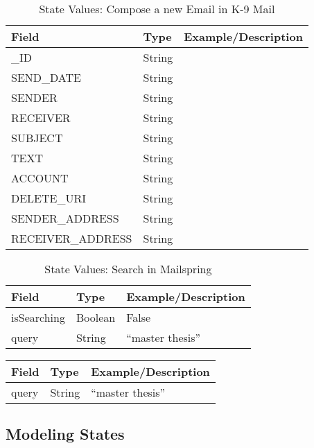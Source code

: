 \FloatBarrier \begin{table}[H]
\centering
\begin{tabular}{lll}
Field     & Type      & Example/Description \\
\hline
\_ID            & String &  \\
SEND\_DATE      & String     &                     \\
SENDER         &  String    &                     \\
RECEIVER         &  String    &                     \\
SUBJECT        &  String    &                     \\
TEXT        &  String    &                     \\
ACCOUNT        &   String   &                     \\
DELETE\_URI     &  String    &                     \\
SENDER\_ADDRESS &   String   &                    \\
RECEIVER\_ADDRESS &   String   &                    
\end{tabular}
\caption{State Values: Compose a new Email in K-9 Mail}
\label{tab:compose_new_email_k9}
\centering
\end{table} \FloatBarrier



\FloatBarrier \begin{table}[H]
\centering
\begin{tabular}{lll}
Field       & Type    & Example/Description \\
\hline
isSearching & Boolean & False               \\
query       & String  & “master   thesis”  
\end{tabular}
\caption{State Values: Search in Mailspring}
\label{tab:search_mailspring}
\end{table} \FloatBarrier



\FloatBarrier \begin{table}[H]
\centering
\begin{tabular}{lll}
Field & Type   & Example/Description \\
\hline
query & String & “master thesis”    
\end{tabular}
\end{table} \FloatBarrier


\subsection{Modeling States}
